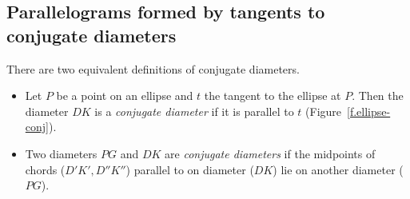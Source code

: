 
\subsection{Parallelograms formed by tangents to conjugate diameters}

There are two equivalent definitions of conjugate diameters.

\begin{definition}\label{def.conjugate}\mbox{}

\begin{itemize}
\item Let $P$ be a point on an ellipse and $t$ the tangent to the ellipse at $P$. Then the diameter $DK$ is a \emph{conjugate diameter} if it is parallel to $t$ (Figure~\ref{f.ellipse-conj}).
\item Two diameters $PG$ and $DK$ are \emph{conjugate diameters} if the midpoints of chords ($D'K', D''K''$) parallel to on diameter ($DK$) lie on another diameter ($PG$).
\end{itemize}
\end{definition}

